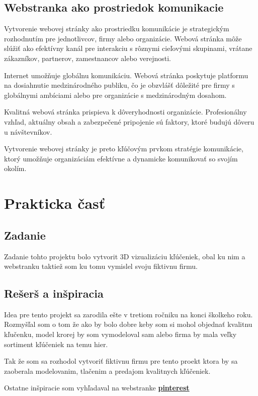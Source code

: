     \subsection{Webstranka ako prostriedok komunikacie}
      Vytvorenie webovej stránky ako prostriedku komunikácie je strategickým rozhodnutím pre jednotlivcov, firmy alebo organizácie. Webová stránka môže slúžiť ako efektívny kanál pre interakciu s rôznymi cieľovými skupinami, vrátane zákazníkov, partnerov, zamestnancov alebo verejnosti. 

      Internet umožňuje globálnu komunikáciu. Webová stránka poskytuje platformu na dosiahnutie medzinárodného publiku, čo je obzvlášť dôležité pre firmy s globálnymi ambíciami alebo pre organizácie s medzinárodným dosahom.
    
      Kvalitná webová stránka prispieva k dôveryhodnosti organizácie. Profesionálny vzhľad, aktuálny obsah a zabezpečené pripojenie sú faktory, ktoré budujú dôveru u návštevníkov.


      Vytvorenie webovej stránky je preto kľúčovým prvkom stratégie komunikácie, ktorý umožňuje organizáciám efektívne a dynamicke komunikovať so svojím okolím.

  \newpage

  \section{Prakticka časť}
    \subsection{Zadanie}
      Zadanie tohto projektu bolo vytvorit 3D vizualizáciu kľúčeniek, obal ku nim a webstranku taktiež som ku tomu vymislel svoju fiktivnu firmu.

    \subsection{Rešerš a inšpiracia}
      Idea pre tento projekt sa zarodila ešte v tretiom ročniku na konci školkeho roku. Rozmyšľal som o tom že ako by bolo dobre keby som si mohol objednať kvalitnu kľučenku, model krorej by som vymodeloval sam alebo firma by mala veľky sortiment kľúčeniek na temu hier. 

      Tak že som sa rozhodol vytvoriť fiktivnu firmu pre tento proekt ktora by sa zaoberala modelovanim, tlačenim a predajom kvalitnych kľúčeniek.

      Ostatne inšpiracie som vyhľadaval na webstranke \textbf{\href{https://pinterest.com}{pinterest}}

